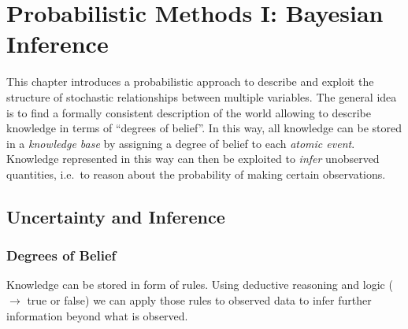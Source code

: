 
\newpage
\section{Probabilistic Methods I: Bayesian Inference}
\setcounter{equation}{0}

This chapter introduces a probabilistic approach to describe and
exploit the structure of stochastic relationships between multiple
variables. The general idea is to find a formally consistent
description of the world allowing to describe knowledge in terms of
``degrees of belief''. In this way, all knowledge can be stored in a
\emph{knowledge base} by assigning a degree of belief to each
\emph{atomic event}. Knowledge represented in this way can then be
exploited to \emph{infer} unobserved quantities, i.e.\ to reason about
the probability of making certain observations.

\subsection{Uncertainty and Inference}


\subsubsection{Degrees of Belief}
Knowledge can be stored in form of rules. Using deductive reasoning
and logic ($\rightarrow$ true or false) we can apply those rules to
observed data to infer further information beyond what is observed.
\begin{figure}[h] 
  \centering
{}
\end{figure}

